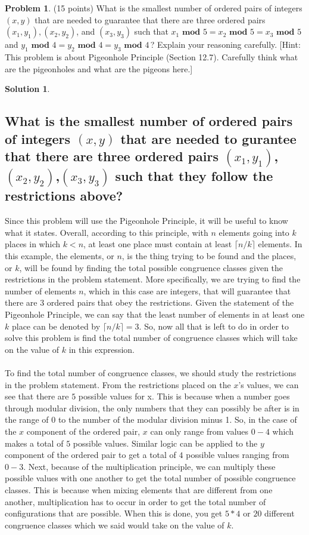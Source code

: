 \documentclass{article}
\theoremstyle{definition}
\newtheorem{problem}{Problem}
\newtheorem*{solution}{Solution}
\begin{document}
\newpage
\begin{problem} (15 points) What is the smallest number of ordered pairs of integers 
$(x, y)$ that are needed to guarantee that there are three ordered pairs 
$(x_1, y_1), (x_2, y_2)$, and $(x_3, y_3)$ such that
$x_1\textbf{ mod } 5 = x_2 \textbf{ mod } 5 = x_3 \textbf{ mod } 5$ and 
$y_1 \textbf{ mod } 4 = y_2 \textbf{ mod } 4 = y_3 \textbf{ mod } 4$\,?
Explain your reasoning carefully.
[Hint: This problem is about Pigeonhole Principle (Section 12.7). 
Carefully think what are the pigeonholes and what are the pigeons here.]
\end{problem}
\begin{solution}
\hspace{1cm}
\subsection*{What is the smallest number of ordered pairs of integers $(x,y)$ that are needed to gurantee that there are three ordered pairs $(x_1,y_1)$,$(x_2,y_2)$,$(x_3,y_3)$ such that they follow the restrictions above?}
Since this problem will use the Pigeonhole Principle, it will be useful to know what it states. Overall, according to this principle, with $n$ elements going into $k$ places in which $ k < n$, at least one place must contain at least $\lceil n / k \rceil$ elements. In this example, the elements, or $n$, is the thing trying to be found and the places, or $k$, will be found by finding the total possible congruence classes given the restrictions in the problem statement. More specifically, we are trying to find the number of elements $n$, which in this case are integers, that will guarantee that there are 3 ordered pairs that obey the restrictions. Given the statement of the Pigeonhole Principle, we can say that the least number of elements in at least one $k$ place can be denoted by $\lceil n / k \rceil = 3$. So, now all that is left to do in order to solve this problem is find the total number of congruence classes which will take on the value of $k$ in this expression.\\\\
To find the total number of congruence classes, we should study the restrictions in the problem statement. From the restrictions placed on the $x$'s values, we can see that there are $5$ possible values for x. This is because when a number goes through modular division, the only numbers that they can possibly be after is in the range of $0$ to the number of the modular division minus 1. So, in the case of the $x$ component of the ordered pair, $x$ can only range from values $0-4$ which makes a total of $5$ possible values. Similar logic can be applied to the $y$ component of the ordered pair to get a total of $4$ possible values ranging from $0-3$. Next, because of the multiplication principle, we can multiply these possible values with one another to get the total number of possible congruence classes. This is because when mixing elements that are different from one another, multiplication has to occur in order to get the total number of configurations that are possible. When this is done, you get $5*4$ or $20$ different congruence classes which we said would take on the value of $k$.\\\\

\end{solution}
\end{document}
